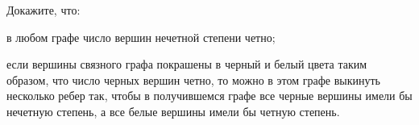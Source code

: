 Докажите, что:
\begin{enumcyr}
    \item в любом графе число вершин нечетной степени четно;
    \item если вершины связного графа покрашены в черный и белый цвета таким образом, что число черных
        вершин четно, то можно в этом графе выкинуть несколько ребер так, чтобы в получившемся графе все
        черные вершины имели бы нечетную степень, а все белые вершины имели бы четную степень.
\end{enumcyr}